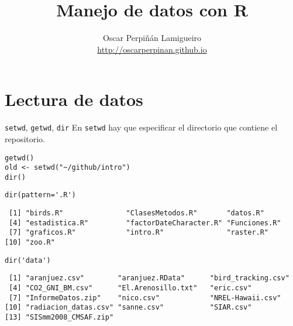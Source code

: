 \documentclass[xcolor={usenames,svgnames,dvipsnames}]{beamer}
\author{Oscar Perpiñán Lamigueiro \\ \url{http://oscarperpinan.github.io}}
\date{}
\title{Manejo de datos con R}
\begin{document}
\maketitle

\section{Lectura de datos}
\label{sec:org31de411}
\begin{frame}[label={sec:orgc617302},fragile]{\texttt{setwd}, \texttt{getwd}, \texttt{dir}}
 En \texttt{setwd} hay que especificar el directorio que contiene el repositorio.
\lstset{language=r,label= ,caption= ,captionpos=b,numbers=none}
\begin{lstlisting}
getwd()
old <- setwd("~/github/intro")
dir()
\end{lstlisting}

\lstset{language=r,label= ,caption= ,captionpos=b,numbers=none}
\begin{lstlisting}
dir(pattern='.R')
\end{lstlisting}

\begin{verbatim}
 [1] "birds.R"               "ClasesMetodos.R"       "datos.R"              
 [4] "estadistica.R"         "factorDateCharacter.R" "Funciones.R"          
 [7] "graficos.R"            "intro.R"               "raster.R"             
[10] "zoo.R"
\end{verbatim}


\lstset{language=r,label= ,caption= ,captionpos=b,numbers=none}
\begin{lstlisting}
dir('data')
\end{lstlisting}

\begin{verbatim}
 [1] "aranjuez.csv"        "aranjuez.RData"      "bird_tracking.csv"  
 [4] "CO2_GNI_BM.csv"      "El.Arenosillo.txt"   "eric.csv"           
 [7] "InformeDatos.zip"    "nico.csv"            "NREL-Hawaii.csv"    
[10] "radiacion_datas.csv" "sanne.csv"           "SIAR.csv"           
[13] "SISmm2008_CMSAF.zip"
\end{verbatim}
\end{frame}
\end{document}
